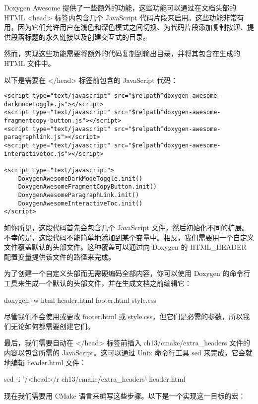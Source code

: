 Doxygen Awesome 提供了一些额外的功能，这些功能可以通过在文档头部的 HTML <head> 标签内包含几个 JavaScript 代码片段来启用。这些功能非常有用，因为它们允许用户在浅色和深色模式之间切换、为代码片段添加复制按钮、提供段落标题的永久链接以及创建交互式的目录。

然而，实现这些功能需要将额外的代码复制到输出目录，并将其包含在生成的 HTML 文件中。

以下是需要在 </head> 标签前包含的 JavaScript 代码：


\begin{verbatim}
<script type="text/javascript" src="$relpath^doxygen-awesome-darkmodetoggle.js"></script>
<script type="text/javascript" src="$relpath^doxygen-awesome-fragmentcopy-button.js"></script>
<script type="text/javascript" src="$relpath^doxygen-awesome-paragraphlink.js"></script>
<script type="text/javascript" src="$relpath^doxygen-awesome-interactivetoc.js"></script>

<script type="text/javascript">
    DoxygenAwesomeDarkModeToggle.init()
    DoxygenAwesomeFragmentCopyButton.init()
    DoxygenAwesomeParagraphLink.init()
    DoxygenAwesomeInteractiveToc.init()
</script>
\end{verbatim}

如你所见，这段代码首先会包含几个 JavaScript 文件，然后初始化不同的扩展。不幸的是，这段代码不能简单地添加到某个变量中。相反，我们需要用一个自定义文件覆盖默认的头部文件。这种覆盖可以通过向 Doxygen 的 HTML\_HEADER 配置变量提供该文件的路径来完成。

为了创建一个自定义头部而无需硬编码全部内容，你可以使用 Doxygen 的命令行工具来生成一个默认的头部文件，并在生成文档之前编辑它：

\begin{shell}
doxygen -w html header.html footer.html style.css
\end{shell}

尽管我们不会使用或更改 footer.html 或 style.css，但它们是必需的参数，所以我们无论如何都需要创建它们。

最后，我们需要自动在 </head> 标签前插入 ch13/cmake/extra\_headers 文件的内容以包含所需的 JavaScript。这可以通过 Unix 命令行工具 sed 来完成，它会就地编辑 header.html 文件：

\begin{shell}
sed -i '/<\/head>/r ch13/cmake/extra_headers' header.html
\end{shell}

现在我们需要用 CMake 语言来编写这些步骤。以下是一个实现这一目标的宏：


